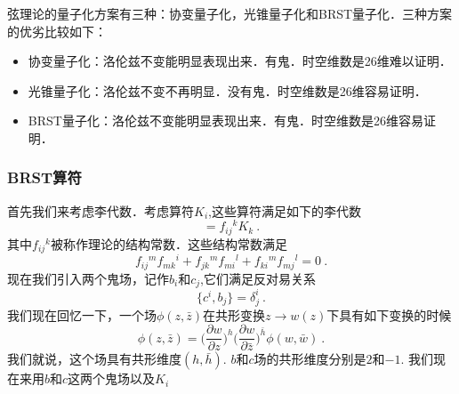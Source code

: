 弦理论的量子化方案有三种：协变量子化，光锥量子化和BRST量子化．三种方案的优劣比较如下：
\begin{itemize}
\item 协变量子化：洛伦兹不变能明显表现出来．有鬼．时空维数是26维难以证明．
\item 光锥量子化：洛伦兹不变不再明显．没有鬼．时空维数是26维容易证明．
\item BRST量子化：洛伦兹不变能明显表现出来．有鬼．时空维数是26维容易证明．
\end{itemize}
\subsubsection{BRST算符}
首先我们来考虑李代数．考虑算符$K_i$,这些算符满足如下的李代数
\begin{equation}
[K_i,K_j] = f_{ij}{}^k K_k~.
\end{equation}
其中$f_{ij}{}^k$被称作理论的结构常数．这些结构常数满足
\begin{equation}
f_{ij}{}^m f_{mk}{}^i + f_{jk}{}^m f_{mi}{}^l+f_{ki}{}^m f_{mj}{}^l = 0 ~. 
\end{equation}
现在我们引入两个鬼场，记作$b_i$和$c_j$,它们满足反对易关系
\begin{equation}
\{ c^i, b_j \} = \delta^i_j~.
\end{equation}
我们现在回忆一下，一个场$\phi(z,\bar z)$在共形变换$z\rightarrow w(z)$下具有如下变换的时候
\begin{equation}
\phi(z,\bar z) = \bigg( \frac{\partial w}{\partial z} \bigg)^h \bigg( \frac{\partial w}{\partial \bar z} \bigg)^{\bar h} \phi (w,\bar w)~.
\end{equation}
我们就说，这个场具有共形维度$(h,\bar h)$. $b$和$c$场的共形维度分别是$2$和$-1$. 我们现在来用$b$和$c$这两个鬼场以及$K_i$









